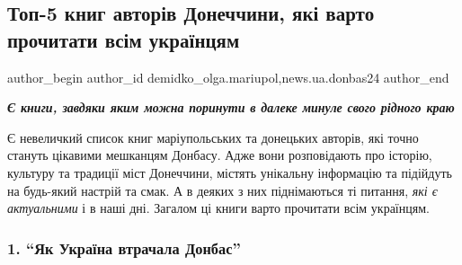  
 
 
 
 
 
\subsection{Топ-5 книг авторів Донеччини, які варто прочитати всім українцям}
\label{sec:16_09_2022.stz.news.ua.donbas24.1.top_5_knyg_donechyny_varto_prochytaty_ukraincjam}
 
\ifcmt
 author_begin
   author_id demidko_olga.mariupol,news.ua.donbas24
 author_end
\fi


\begin{center}
  \em\color{blue}\bfseries\Large
  Є книги, завдяки яким можна поринути в далеке минуле свого рідного краю 
\end{center}

Є невеличкий список книг маріупольських та донецьких авторів, які точно стануть
цікавими мешканцям Донбасу. Адже вони розповідають про історію, культуру та
традиції міст Донеччини, містять унікальну інформацію та підійдуть на будь-який
настрій та смак. А в деяких з них піднімаються ті питання, \emph{які є актуальними} і
в наші дні. Загалом ці книги варто прочитати всім українцям.

\subsubsection{1. \enquote{Як Україна втрачала Донбас}}



